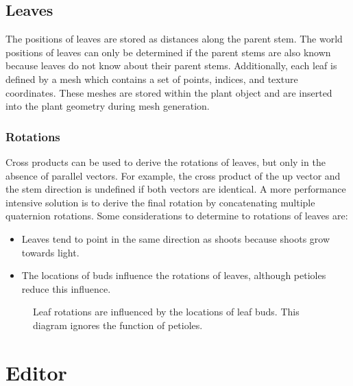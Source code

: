\documentclass[10pt]{article}
\begin{document}
\subsection{Leaves}
The positions of leaves are stored as distances along the parent stem. The world positions of leaves can only be determined if the parent stems are also known because leaves do not know about their parent stems. Additionally, each leaf is defined by a mesh which contains a set of points, indices, and texture coordinates. These meshes are stored within the plant object and are inserted into the plant geometry during mesh generation.

\subsubsection{Rotations}
\begin{minipage}[t]{0.6\textwidth}
Cross products can be used to derive the rotations of leaves, but only in the absence of parallel vectors. For example, the cross product of the up vector and the stem direction is undefined if both vectors are identical. A more performance intensive solution is to derive the final rotation by concatenating multiple quaternion rotations. Some considerations to determine to rotations of leaves are:
\begin{itemize}
\item Leaves tend to point in the same direction as shoots because shoots grow towards light.
\item The locations of buds influence the rotations of leaves, although petioles reduce this influence.
\end{itemize}
\end{minipage}
\hfill
\begin{minipage}[t]{0.3\textwidth}
 \begin{figure}[H]
  \centering
  
  \caption{Leaf rotations are influenced by the locations of leaf buds. This diagram ignores the function of petioles.}
 \end{figure}
\end{minipage}

\section{Editor}
\end{document}

